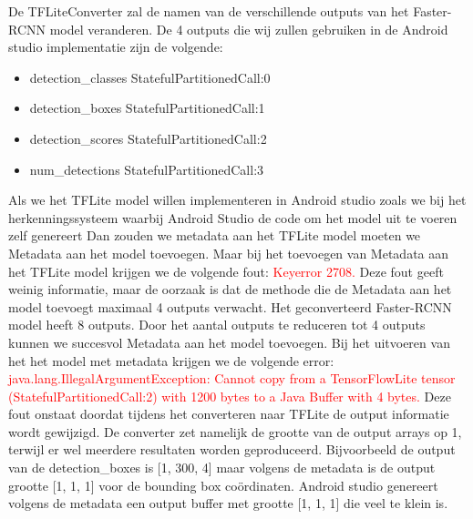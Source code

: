 De TFLiteConverter zal de namen van de verschillende outputs van het Faster-RCNN model veranderen.
De 4 outputs die wij zullen gebruiken in de Android studio implementatie zijn de volgende:

\begin{itemize}
	\item detection\_classes \textrightarrow StatefulPartitionedCall:0
	\item detection\_boxes \textrightarrow StatefulPartitionedCall:1
	\item detection\_scores \textrightarrow StatefulPartitionedCall:2
    \item num\_detections \textrightarrow StatefulPartitionedCall:3
\end{itemize}


Als we het TFLite model willen implementeren in Android studio zoals we bij het herkenningssysteem waarbij Android Studio de code om het model uit te voeren zelf genereert
Dan zouden we metadata aan het TFLite model moeten we Metadata aan het model toevoegen.
Maar bij het toevoegen van Metadata aan het TFLite model krijgen we de volgende fout: \textcolor{red}{Keyerror 2708.}
Deze fout geeft weinig informatie, maar de oorzaak is dat de methode die de Metadata aan het model toevoegt maximaal 4 outputs verwacht.
Het geconverteerd Faster-RCNN model heeft 8 outputs.
Door het aantal outputs te reduceren tot 4 outputs kunnen we succesvol Metadata aan het model toevoegen.
Bij het uitvoeren van het het model met metadata krijgen we de volgende error: 
\textcolor{red}{java.lang.IllegalArgumentException: Cannot copy from a TensorFlowLite tensor (StatefulPartitionedCall:2) with 1200 bytes to a Java Buffer with 4 bytes.}
\newline
Deze fout onstaat doordat tijdens het converteren naar TFLite de output informatie wordt gewijzigd.
De converter zet namelijk de grootte van de output arrays op 1, terwijl er wel meerdere resultaten worden geproduceerd.
Bijvoorbeeld de output van de detection\_boxes is [1, 300, 4] maar volgens de metadata is de output grootte [1, 1, 1] voor de bounding box co\"ordinaten.
Android studio genereert volgens de metadata een output buffer met grootte [1, 1, 1] die veel te klein is.

